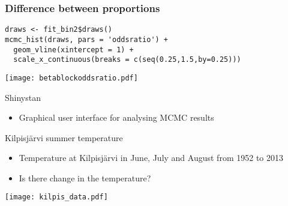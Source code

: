 \documentclass[finnish,english,t]{beamer}
\begin{document}
\begin{frame}[fragile]
  \frametitle{Difference between proportions}
  
  {\small
\begin{lstlisting}
draws <- fit_bin2$draws()
mcmc_hist(draws, pars = 'oddsratio') +
  geom_vline(xintercept = 1) +
  scale_x_continuous(breaks = c(seq(0.25,1.5,by=0.25)))
\end{lstlisting}
  }

  \begin{center}
  \texttt{[image: betablockoddsratio.pdf]}
\end{center}
\end{frame}


  

  
  
\begin{frame}{Shinystan}

  \begin{itemize}
  \item Graphical user interface for analysing MCMC results
  \end{itemize}
  
\end{frame} 

\begin{frame}{Kilpisjärvi summer temperature}
  
  \begin{itemize}
  \item Temperature at Kilpisjärvi in June, July and August from 1952 to 2013
  \item Is there change in the temperature?
  \end{itemize}
  \begin{center}
    \texttt{[image: kilpis\_data.pdf]}
  \end{center}
  
\end{frame}
\end{document}
